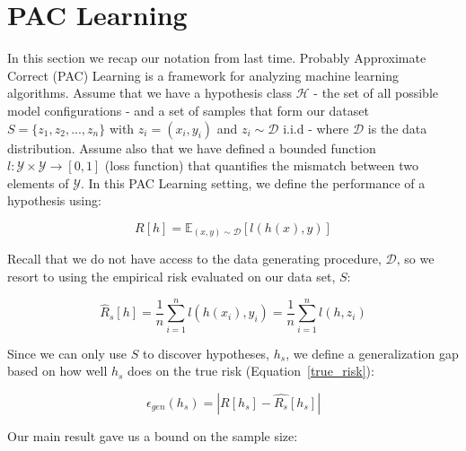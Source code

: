 \documentclass{article}
\begin{document}
\section{PAC Learning}
In this section we recap our notation from last time. Probably Approximate Correct (PAC) Learning is a framework for analyzing machine learning algorithms. Assume that we have a hypothesis class $\mathcal{H}$ - the set of all possible model configurations - and a set of samples that form our dataset $S = \{z_1, z_2, ..., z_n\}$ with $z_i = (x_i, y_i)$ and $z_i \sim \mathcal{D}$ i.i.d - where $\mathcal{D}$ is the data distribution. Assume also that we have defined a bounded function $l: \mathcal{Y} \times \mathcal{Y} \rightarrow [0, 1]$ (loss function) that quantifies the mismatch between two elements of $\mathcal{Y}$. In this PAC Learning setting, we define the performance of a hypothesis using:
\begin{defn}[Risk]
\[
	R[h] = \mathbb{E}_{(x, y) \sim \mathcal{D}}[l(h(x), y)]
\]
\label{true_risk}
\end{defn}
Recall that we do not have access to the data generating procedure, $\mathcal{D}$, so we resort to using the empirical risk evaluated on our data set, $S$:
\begin{defn}
\[
	\hat{R}_s[h] = \frac{1}{n}\sum_{i=1}^{n} l(h(x_i), y_i) = \frac{1}{n}\sum_{i=1}^{n} l(h,z_i)
\]
\end{defn}
Since we can only use $S$ to discover hypotheses, $h_s$, we define a generalization gap based on how well $h_s$ does on the true risk (Equation~\ref{true_risk}):
\begin{defn}
\[
	\epsilon_{gen}(h_s) = | R[h_s] - \hat{R_s}[h_s] |
\]
\end{defn}
Our main result gave us a bound on the sample size:


\end{document}

